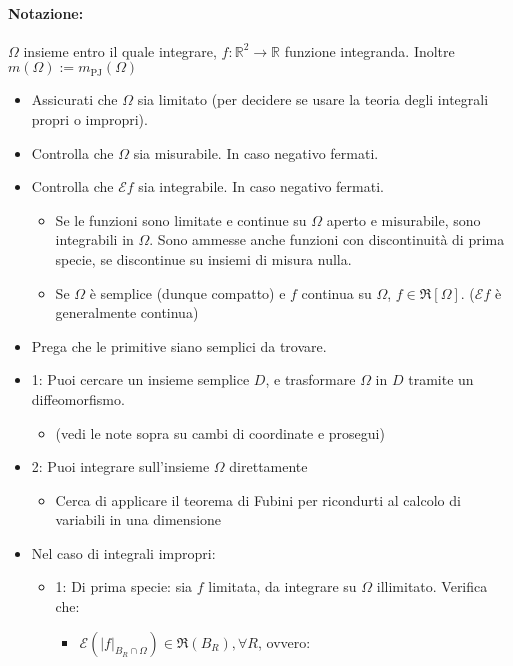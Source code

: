 \documentclass[a4paper,12pt]{article}
\begin{document}
\paragraph{Notazione:}
$\Omega$ insieme entro il quale integrare, $f:\mathbb{R}^2\rightarrow\mathbb{R}$ funzione integranda.
Inoltre $m(\Omega) := m_{\mathrm{PJ}}(\Omega)$
\begin{itemize}
 \item Assicurati che $\Omega$ sia limitato (per decidere se usare la teoria degli integrali propri o impropri).
 \item Controlla che $\Omega$ sia misurabile. In caso negativo fermati.
 \item Controlla che $\mathcal{E}f$ sia integrabile. In caso negativo fermati.
 \begin{itemize}
  \item Se le funzioni sono limitate e continue su $\Omega$ aperto e misurabile, sono integrabili in $\Omega$. Sono ammesse anche funzioni con discontinuità di prima specie, se discontinue su insiemi di misura nulla.
  \item Se $\Omega$ è semplice (dunque compatto) e $f$ continua su $\Omega$, $f\in\Re[\Omega]$. ($\mathcal{E}f$ è generalmente continua)
 \end{itemize}
 \item Prega che le primitive siano semplici da trovare.
 \item 1: Puoi cercare un insieme semplice $D$, e trasformare $\Omega$ in $D$ tramite un diffeomorfismo.
 \begin{itemize}
  \item (vedi le note sopra su cambi di coordinate e prosegui)
 \end{itemize}
 \item 2: Puoi integrare sull'insieme $\Omega$ direttamente
 \begin{itemize}
  \item Cerca di applicare il teorema di Fubini per ricondurti al calcolo di variabili in una dimensione
 \end{itemize}
 \item Nel caso di integrali impropri:
 \begin{itemize}
  \item 1: Di prima specie: sia $f$ limitata, da integrare su $\Omega$ illimitato. Verifica che:
  \begin{itemize}
   \item $\mathcal{E}(|f|_{B_R\cap\Omega}) \in \Re(B_R), \forall R$, ovvero:
   \begin{itemize}

\end{itemize}
\end{itemize}
\end{itemize}
\end{itemize}
\end{document}
